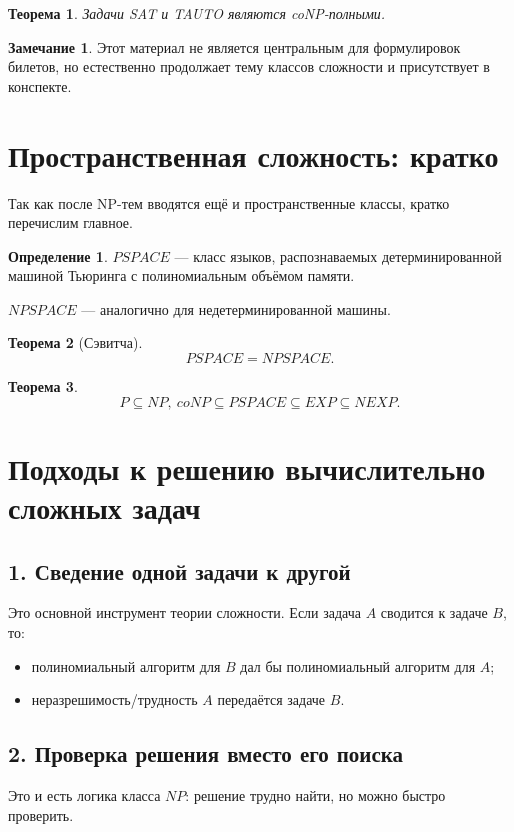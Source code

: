 \documentclass[12pt,a4paper]{article}
\theoremstyle{definition}
\newtheorem{definition}{Определение}[section]
\newtheorem{remark}{Замечание}[section]
\theoremstyle{plain}
\newtheorem{theorem}{Теорема}[section]
\begin{document}
\begin{theorem}
Задачи \textsc{SAT} и \textsc{TAUTO} являются coNP-полными.
\end{theorem}

\begin{remark}
Этот материал не является центральным для формулировок билетов, но естественно продолжает тему классов сложности и присутствует в конспекте.
\end{remark}

\section{Пространственная сложность: кратко}

Так как после NP-тем вводятся ещё и пространственные классы, кратко перечислим главное.

\begin{definition}
$PSPACE$ --- класс языков, распознаваемых детерминированной машиной Тьюринга с полиномиальным объёмом памяти.

$NPSPACE$ --- аналогично для недетерминированной машины.
\end{definition}

\begin{theorem}[Сэвитча]
\[
PSPACE=NPSPACE.
\]
\end{theorem}

\begin{theorem}
\[
P\subseteq NP,\ coNP\subseteq PSPACE\subseteq EXP\subseteq NEXP.
\]
\end{theorem}

\section{Подходы к решению вычислительно сложных задач}

\subsection{1. Сведение одной задачи к другой}
Это основной инструмент теории сложности.
Если задача $A$ сводится к задаче $B$, то:
\begin{itemize}
\item полиномиальный алгоритм для $B$ дал бы полиномиальный алгоритм для $A$;
\item неразрешимость/трудность $A$ передаётся задаче $B$.
\end{itemize}

\subsection{2. Проверка решения вместо его поиска}
Это и есть логика класса $NP$: решение трудно найти, но можно быстро проверить.
\end{document}
